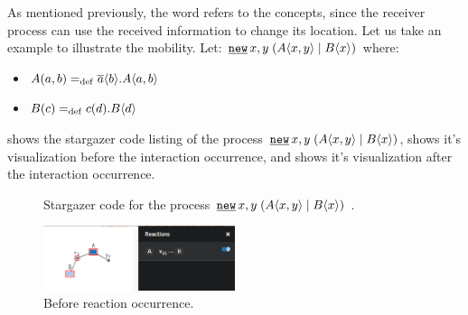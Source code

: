 As mentioned previously, the word  refers to the  concepts, since the receiver process can use the received information to change its location. Let us take an example to illustrate the mobility. Let: $\procres{x,y}{(\procpar{\proccall{A}{x,y}}{\proccall{B}{x}})}$ where:
\begin{itemize}
\item $A(a,b)=_{\mathrm{def}}{}\overline{a}\langle{b}\rangle.A\langle a,b\rangle$
\item $B(c)=_{\mathrm{def}}{}c({d}).B\langle d\rangle$
\end{itemize}


 shows the stargazer code listing of the process $\procres{x,y}{(\procpar{\proccall{A}{x,y}}{\proccall{B}{x}})}$,   shows it's visualization before the interaction occurrence, and  shows it's visualization after the interaction occurrence.
\begin{figure}[ht!]

\caption{Stargazer code for the process $\procres{x,y}{(\procpar{\proccall{A}{x,y}}{\proccall{B}{x}})}$ .}
\label{pi_mobility_stargazer_code}
\end{figure}
\raggedbottom
\begin{figure}[ht!]
	\centering
	\includegraphics[width=0.5\textwidth]{./images/pi_mobility_stargazer_Before_react.png}
	\caption{Before reaction occurrence.}
	\label{pi_mobility_stargazer_Before_react}
\end{figure}

